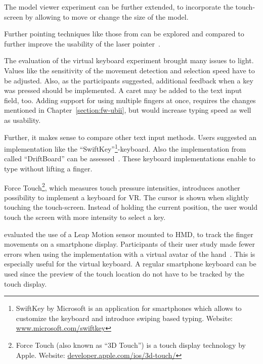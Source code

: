 The model viewer experiment can be further extended, to incorporate the touch-screen by allowing to move or change the size of the model.

Further pointing techniques like those from \citeauthor{Argelaguet.2013} can be explored and compared to further improve the usability of the laser pointer~\cite[123]{Argelaguet.2013}.

The evaluation of the virtual keyboard experiment brought many issues to light. 
Values like the sensitivity of the movement detection and selection speed have to be adjusted. Also, as the participants suggested, additional feedback when a key was pressed should be implemented. A caret may be added to the text input field, too. Adding support for using multiple fingers at once, requires the changes mentioned in Chapter~\ref{section:fw-ubii}, but would increase typing speed as well as usability.

Further, it makes sense to compare other text input methods. Users suggested an implementation like the \enquote{SwiftKey}\footnote{SwiftKey by Microsoft is an application for smartphones which allows to customize the keyboard and introduce swiping based typing. Website: \href{https://www.microsoft.com/swiftkey}{www.microsoft.com/swiftkey}}-keyboard. Also the implementation from \citeauthor{Shibata.2016} called \enquote{DriftBoard} can be assessed~\cite{Shibata.2016}. These keyboard implementations enable to type without lifting a finger. 

Force Touch\footnote{Force Touch (also known as \enquote{3D Touch}) is a touch display technology by Apple. Website: \href{https://developer.apple.com/ios/3d-touch/}{developer.apple.com/ios/3d-touch/}}, which measures touch pressure intensities, introduces another possibility to implement a keyboard for \gls{VR}. The cursor is shown when slightly touching the touch-screen. Instead of holding the current position, the user would touch the screen with more intensity to select a key. 

\citeauthor{Afonso.2017} evaluated the use of a Leap Motion sensor mounted to \gls{HMD}, to track the finger movements on a smartphone display. Participants of their user study made fewer errors when using the implementation with a virtual avatar of the hand~\cite[247\psq]{Afonso.2017}. This is especially useful for the virtual keyboard. A regular smartphone keyboard can be used since the preview of the touch location do not have to be tracked by the touch display.

